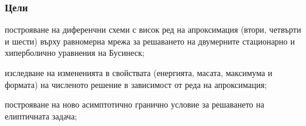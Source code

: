 \documentclass{beamer}
\newcommand{\rf}[1]{(\ref{#1})}
\begin{document}
\begin{frame}
\frametitle{Цели }
\begin{itemize}
{%
 \item построяване на диференчни схеми с висок ред на апроксимация (втори, четвърти и шести) върху равномерна мрежа за решаването на двумерните стационарно и хиперболично уравнения на Бусинеск;
  \item изследване на измененията в свойствата (енергията, масата, максимума и формата) на численото решение в зависимост от реда на апроксимация;
  \item построяване на ново асимптотично гранично условие за решаването на елиптичната задача;
  }
\end{itemize}
\end{frame}
\end{document}
